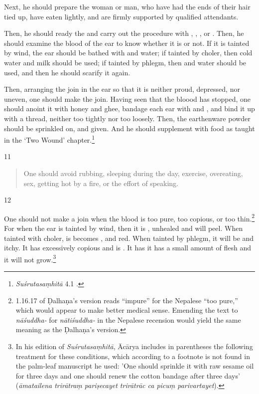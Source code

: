 \begin{translation}
    Next, he should prepare the woman or man, who have had the ends of their hair tied 
    up, have eaten lightly, and are firmly supported by qualified 
    attendants.
    
    Then, he should ready the  and carry out the procedure with
    , , , or
    . Then, he should examine the blood of the ear to know whether it is 
     or not. If it is tainted by wind, the ear should be
    bathed with  and water; if tainted by choler, 
    then cold water
    and milk should be used; if tainted by phlegm, then  and water
    should be used, and then he should scarify it again.
    
    
    Then, arranging the join in the ear so that it is neither proud, depressed, nor
    uneven, one should make the join. Having seen that the bloood has stopped, one should anoint it with honey and ghee,
    bandage each ear with  and , and
    bind it up with a thread, neither too tightly nor too loosely.  Then, the earthenware
    powder should be sprinkled on, and  given.
    And he should supplement with food as taught in  the `Two Wound'
    chapter.\footnote{\emph{Suśrutasaṃhitā} 4.1 \citep[396–408]{vulgate}.}
    
    \item[11]
    \begin{verse}
        One should avoid rubbing, sleeping during the day, exercise, overeating,
        sex, getting hot by a fire, or the effort of speaking.
    \end{verse}
    
    \item[12]
    
    One should not make a join when the blood is too pure, too copious, or too
    thin.\footnote{1.16.17 of Ḍalhaṇa's version \citep[79]{vulgate} reads “impure” for the Nepalese “too pure,” which would
    appear to make better medical sense.  Emending the text to \emph{nāśuddha-} for
    \emph{nātiśuddha-} in the Nepalese recension would yield the same meaning as the
    Ḍalhaṇa's version.} For when the ear is tainted by wind, then it is
    , unhealed and will peel. When tainted with
    choler, is becomes ,  and red.  When tainted
    by phlegm, it will be  and itchy.  It has excessively copious
     and is .  It has it has a small
    amount of  flesh and it will not grow.\footnote{In his edition of \emph{Suśrutasaṃhitā}, Ācārya \citep[79 n. 1]{vulgate} includes in parentheses the following treatment for these conditions, which according to a footnote is not found in the palm-leaf manuscript he used: 'One should sprinkle it with raw sesame oil for three days and one should renew the cotton bandage after three days' (\emph{āmatailena trirātraṃ pariṣecayet trirātrāc ca picuṃ parivartayet}).}
    

\end{translation}
